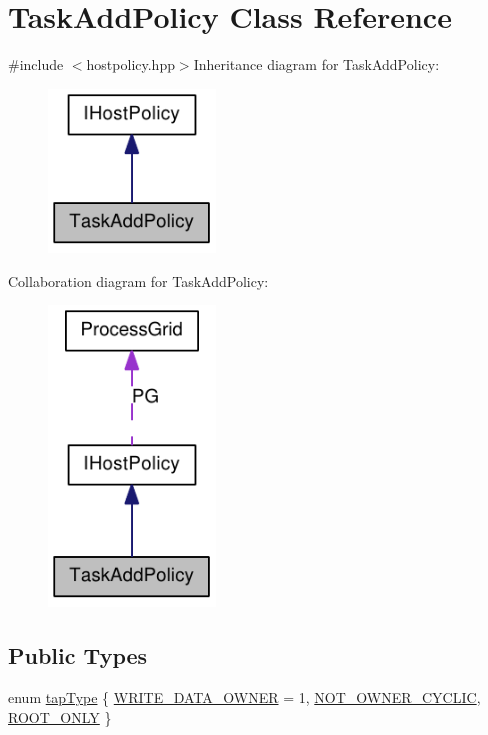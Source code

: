 \hypertarget{class_task_add_policy}{
\section{TaskAddPolicy Class Reference}
\label{class_task_add_policy}
}


{\ttfamily \#include $<$hostpolicy.hpp$>$}Inheritance diagram for TaskAddPolicy:\nopagebreak
\begin{figure}[H]
\begin{center}
\leavevmode
\includegraphics[width=126pt]{class_task_add_policy__inherit__graph}
\end{center}
\end{figure}
Collaboration diagram for TaskAddPolicy:\nopagebreak
\begin{figure}[H]
\begin{center}
\leavevmode
\includegraphics[width=126pt]{class_task_add_policy__coll__graph}
\end{center}
\end{figure}
\subsection*{Public Types}
\begin{DoxyCompactItemize}
\item 
enum \hyperlink{class_task_add_policy_afd8e033ef8b047a0df5c558cae84283e}{tapType} \{ \hyperlink{class_task_add_policy_afd8e033ef8b047a0df5c558cae84283ea0a442bc9b7d6e86b1e0d42ea2b5b2c4f}{WRITE\_\-DATA\_\-OWNER} = 1, 
\hyperlink{class_task_add_policy_afd8e033ef8b047a0df5c558cae84283eac49d7d0717a05341dbd7aff1a5157718}{NOT\_\-OWNER\_\-CYCLIC}, 
\hyperlink{class_task_add_policy_afd8e033ef8b047a0df5c558cae84283ea7e73cbb6ef4a7caa7d911cbaefc1f58c}{ROOT\_\-ONLY}
 \}
\end{DoxyCompactItemize}
